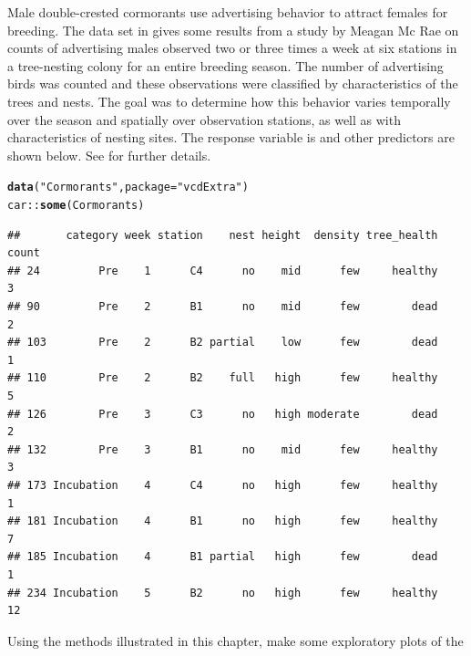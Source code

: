 \documentclass[11pt]{book}\usepackage[]{graphicx}\usepackage[]{color}
\makeatletter
\newcommand{\hlstr}[1]{\textcolor[rgb]{0.192,0.494,0.8}{#1}}%
\newcommand{\hlopt}[1]{\textcolor[rgb]{0,0,0}{#1}}%
\newcommand{\hlstd}[1]{\textcolor[rgb]{0.345,0.345,0.345}{#1}}%
\newcommand{\hlkwc}[1]{\textcolor[rgb]{0.333,0.667,0.333}{#1}}%
\newcommand{\hlkwd}[1]{\textcolor[rgb]{0.737,0.353,0.396}{\textbf{#1}}}%
\newenvironment{kframe}{%
 \def\at@end@of@kframe{}%
 \ifinner\ifhmode%
  \def\at@end@of@kframe{\end{minipage}}%
  \begin{minipage}{\columnwidth}%
 \fi\fi%
 \def\FrameCommand##1{\hskip\@totalleftmargin \hskip-\fboxsep
 \colorbox{shadecolor}{##1}\hskip-\fboxsep
     \hskip-\linewidth \hskip-\@totalleftmargin \hskip\columnwidth}%
 \MakeFramed {\advance\hsize-\width
   \@totalleftmargin\z@ \linewidth\hsize
   \@setminipage}}%
 {\par\unskip\endMakeFramed%
 \at@end@of@kframe}
\newenvironment{knitrout}{}{} %
\renewenvironment{knitrout}{\small\renewcommand{\baselinestretch}{.85}}{} %
\makeatother
\begin{document}
\begin{Exercises}
  \exercise Male double-crested cormorants use advertising behavior to attract females for breeding.
	The  data set in  gives some results from a study by
	Meagan Mc Rae \citeyearpar{McRae:2015} on counts of advertising males observed two or three times a week
	at six stations in a tree-nesting colony for an entire breeding season.
	The number of advertising birds was counted and these observations were classified
	by characteristics of the trees and nests. The goal was to determine how this behavior varies 
	temporally over the season and spatially over observation stations, as well as with 
	characteristics of nesting sites.
	The response variable is 
	and other predictors are shown below.  See 
	for further details.
\begin{knitrout}\footnotesize
{}\color{fgcolor}\begin{kframe}
\begin{alltt}
\hlkwd{data}\hlstd{(}\hlstr{"Cormorants"}\hlstd{,} \hlkwc{package}\hlstd{=}\hlstr{"vcdExtra"}\hlstd{)}
\hlstd{car}\hlopt{::}\hlkwd{some}\hlstd{(Cormorants)}
\end{alltt}
\begin{verbatim}
##       category week station    nest height  density tree_health count
## 24         Pre    1      C4      no    mid      few     healthy     3
## 90         Pre    2      B1      no    mid      few        dead     2
## 103        Pre    2      B2 partial    low      few        dead     1
## 110        Pre    2      B2    full   high      few     healthy     5
## 126        Pre    3      C3      no   high moderate        dead     2
## 132        Pre    3      B1      no    mid      few     healthy     3
## 173 Incubation    4      C4      no   high      few     healthy     1
## 181 Incubation    4      B1      no   high      few     healthy     7
## 185 Incubation    4      B1 partial   high      few        dead     1
## 234 Incubation    5      B2      no   high      few     healthy    12
\end{verbatim}
\end{kframe}
\end{knitrout}
	\begin{enumerate*}
		\item Using the methods illustrated in this chapter, make some exploratory plots of the

\end{enumerate*}
\end{Exercises}
\end{document}

